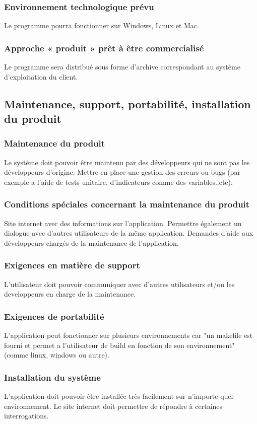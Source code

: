 \documentclass[a4]{article}
\begin{document}
			\subsubsection {Environnement technologique prévu}
				Le programme pourra fonctionner sur Windows, Linux et Mac.
			\subsubsection {Approche « produit » prêt à être commercialisé}
					Le programme sera distribué sous forme d'archive correspondant au système 						d'exploitation du client.
		\subsection{Maintenance, support, portabilité, installation du produit}
			\subsubsection {Maintenance du produit}
				Le système doit pouvoir être maintenu par des développeurs qui ne sont pas les
				développeurs d’origine.
				Mettre en place une gestion des erreurs ou bugs (par exemple a l'aide de tests unitaire, 				d'indicateurs comme des variables..etc).
			\subsubsection {Conditions spéciales concernant la maintenance du produit}
				Site internet avec des informations sur l'application.
				Permettre également un dialogue avec d'autres utilisateurs de la même application.
				Demandes d'aide aux développeurs chargés de la maintenance de l'application.
			\subsubsection {Exigences en matière de support}
				L'utilisateur doit pouvoir communiquer avec d'autres utilisateurs et/ou les developpeurs en 					charge de la maintenance.
			\subsubsection {Exigences de portabilité}
				L'application peut fonctionner sur plusieurs environnements car "un makefile est fourni et 				permet a l'utilisateur de build en fonction de son environnement"(comme linux, windows ou autre).
			\subsubsection {Installation du système}
				L'application doit pouvoir être installée très facilement sur n'importe quel environnement.
				Le site internet doit permettre de répondre à certaines interrogations.
\end{document}
